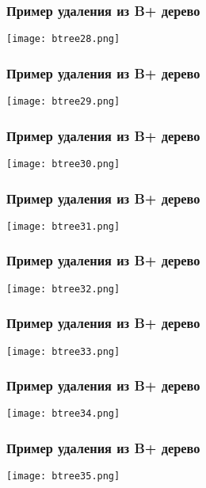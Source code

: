 \begin{frame}
\frametitle{Пример удаления из B+ дерево}
\begin{center}
  \texttt{[image: btree28.png]}
\end{center}
\end{frame}

\begin{frame}
\frametitle{Пример удаления из B+ дерево}
\begin{center}
  \texttt{[image: btree29.png]}
\end{center}
\end{frame}

\begin{frame}
\frametitle{Пример удаления из B+ дерево}
\begin{center}
  \texttt{[image: btree30.png]}
\end{center}
\end{frame}

\begin{frame}
\frametitle{Пример удаления из B+ дерево}
\begin{center}
  \texttt{[image: btree31.png]}
\end{center}
\end{frame}

\begin{frame}
\frametitle{Пример удаления из B+ дерево}
\begin{center}
  \texttt{[image: btree32.png]}
\end{center}
\end{frame}

\begin{frame}
\frametitle{Пример удаления из B+ дерево}
\begin{center}
  \texttt{[image: btree33.png]}
\end{center}
\end{frame}

\begin{frame}
\frametitle{Пример удаления из B+ дерево}
\begin{center}
  \texttt{[image: btree34.png]}
\end{center}
\end{frame}

\begin{frame}
\frametitle{Пример удаления из B+ дерево}
\begin{center}
  \texttt{[image: btree35.png]}
\end{center}
\end{frame}

